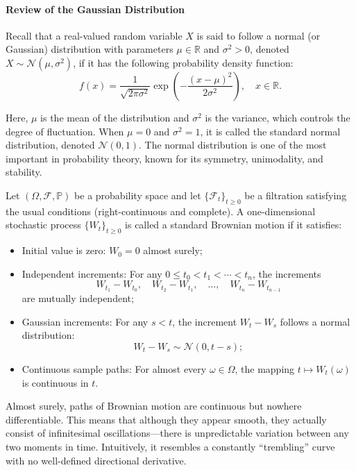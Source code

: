 \documentclass{article}
\begin{document}
\paragraph{Review of the Gaussian Distribution}

Recall that a real-valued random variable $X$ is said to follow a normal (or Gaussian) distribution with parameters $\mu \in \mathbb{R}$ and $\sigma^2 > 0$, denoted $X \sim \mathcal{N}(\mu, \sigma^2)$, if it has the following probability density function:
\[
f(x) = \frac{1}{\sqrt{2\pi \sigma^2}} \exp\left( -\frac{(x - \mu)^2}{2\sigma^2} \right), \quad x \in \mathbb{R}.
\]

Here, $\mu$ is the mean of the distribution and $\sigma^2$ is the variance, which controls the degree of fluctuation. When $\mu = 0$ and $\sigma^2 = 1$, it is called the standard normal distribution, denoted $\mathcal{N}(0, 1)$. The normal distribution is one of the most important in probability theory, known for its symmetry, unimodality, and stability.

\begin{definition}
Let $(\Omega, \mathcal{F}, \mathbb{P})$ be a probability space and let $\{\mathcal{F}_t\}_{t \geq 0}$ be a filtration satisfying the usual conditions (right-continuous and complete). A one-dimensional stochastic process $\{W_t\}_{t \geq 0}$ is called a standard Brownian motion if it satisfies:

\begin{itemize}
    \item Initial value is zero: $W_0 = 0$ almost surely;
    
    \item Independent increments: For any $0 \leq t_0 < t_1 < \cdots < t_n$, the increments
    \[
    W_{t_1} - W_{t_0},\quad W_{t_2} - W_{t_1},\quad \dots,\quad W_{t_n} - W_{t_{n-1}}
    \]
    are mutually independent;
    
    \item Gaussian increments: For any $s < t$, the increment $W_t - W_s$ follows a normal distribution:
    \[
    W_t - W_s \sim \mathcal{N}(0, t - s);
    \]
    
    \item Continuous sample paths: For almost every $\omega \in \Omega$, the mapping $t \mapsto W_t(\omega)$ is continuous in $t$.
\end{itemize}
\end{definition}

Almost surely, paths of Brownian motion are continuous but nowhere differentiable. This means that although they appear smooth, they actually consist of infinitesimal oscillations—there is unpredictable variation between any two moments in time. Intuitively, it resembles a constantly “trembling” curve with no well-defined directional derivative.
\end{document}
